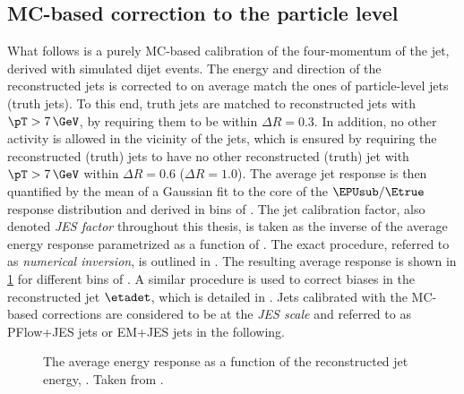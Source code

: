 \subsection{MC-based correction to the particle level}
What follows is a purely MC-based calibration of the four-momentum of the jet, derived with simulated dijet events. The energy and direction of the reconstructed jets is corrected to on average match the ones of particle-level jets (truth jets).
To this end, truth jets are matched to reconstructed jets with $\pT > 7\,\GeV$, by requiring them to be within $\Delta R = 0.3$. In addition, no other activity is allowed in the vicinity of the jets, which is ensured by requiring the reconstructed (truth) jets to have no other reconstructed (truth) jet with $\pT > 7\,\GeV$ within $\Delta R = 0.6$ ($\Delta R = 1.0$).
The average jet response is then quantified by the mean of a Gaussian fit to the core of the $\EPUsub / \Etrue$ response distribution and derived in bins of \Etrue.
The jet calibration factor, also denoted \emph{JES factor} throughout this thesis, is taken as the inverse of the average energy response parametrized as a function of \EPUsub.
The exact procedure, referred to as \emph{numerical inversion}, is outlined in . The resulting average response is shown in \cref{fig:jes-calibration-jet-response} for different bins of \etadet. A similar procedure is used to correct biases in the reconstructed jet $\etadet$, which is detailed in .
Jets calibrated with the MC-based corrections are considered to be at the \emph{JES scale} and referred to as PFlow+JES jets or EM+JES jets in the following.

\begin{figure}[ht]
    \caption[The average jet energy response.]{The average energy response as a function of the reconstructed jet energy, \Ereco. Taken from .}
    \label{fig:jes-calibration-jet-response}
\end{figure}

